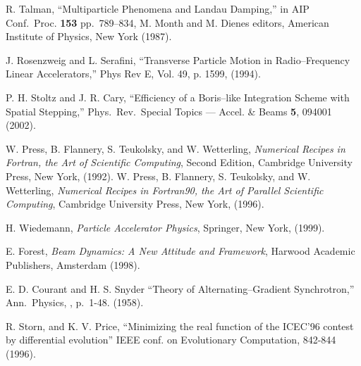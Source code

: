 \begin{thebibliography}{99}
R. Talman, ``Multiparticle Phenomena and Landau Damping,'' in AIP Conf.\ Proc.
{\bf 153} pp.~789--834, M. Month and M. Dienes editors, American Institute of
Physics, New York (1987). 

J. Rosenzweig and L. Serafini, ``Transverse Particle Motion in
Radio--Frequency Linear Accelerators,'' Phys Rev E, Vol. 49, p. 1599,
(1994).

P. H. Stoltz and J. R. Cary, ``Efficiency of a Boris--like Integration
Scheme with Spatial Stepping,'' Phys.\ Rev.\ Special Topics ---
Accel. \& Beams {\bf 5}, 094001 (2002).

W. Press, B. Flannery, S. Teukolsky, and W. Wetterling, {\em Numerical
Recipes in Fortran, the Art of Scientific Computing}, Second Edition,
Cambridge University Press, New York, (1992). \hfill \break
W. Press, B. Flannery, S. Teukolsky, and W. Wetterling, {\em Numerical
Recipes in Fortran90, the Art of Parallel Scientific Computing}, 
Cambridge University Press, New York, (1996).

H. Wiedemann, {\em Particle Accelerator Physics}, Springer, New York, (1999). 

E. Forest, {\em Beam Dynamics: A New Attitude and Framework},
Harwood Academic Publishers, Amsterdam (1998).

E. D. Courant and H. S. Snyder ``Theory of Alternating--Gradient Synchrotron,''
Ann.\ Physics, , p.~1-48. (1958).

R. Storn, and K. V. Price, ``Minimizing the real function of the 
ICEC'96 contest by differential evolution'' IEEE conf. on Evolutionary 
Computation, 842-844 (1996).

\end{thebibliography}
